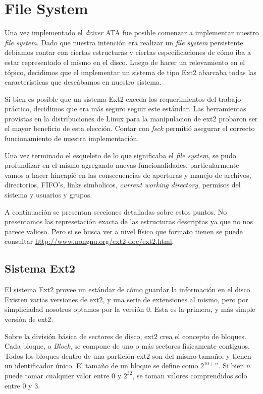 \documentclass[a4paper,10pt]{article}
\begin{document}
\newpage
\section{File System}
    
Una vez implementado el \textit{driver} ATA fue posible comenzar a implementar nuestro \textit{file system}.
Dado que nuestra intención era realizar un \textit{file system} persistente debíamos contar con ciertas estructuras
y ciertas especificaciones de cómo iba a estar representado el mismo en el disco. Luego de hacer un relevamiento
en el tópico, decidimos que el implementar un sistema de tipo Ext2 abarcaba todas las características que deseábamos
en nuestro sistema. 

Si bien es posible que un sistema Ext2 exceda los requerimientos del trabajo práctico, decidimos que era más seguro seguir este estándar. 
Las herramientas provistas en la distribuciones de Linux para la manipulacion de ext2 probaron ser el mayor beneficio de esta elección.
Contar con \textit{fsck} permitió asegurar el correcto funcionamiento de nuestra implementación.

Una vez terminado el esqueleto de lo que significaba el \textit{file system}, se pudo profundizar en el mismo agregando
nuevas funcionalidades, particularmente vamos a hacer hincapié en las consecuencias de aperturas y manejo de
archivos, directorios, FIFO's, links simbolicos, \textit{current working
directory}, permisos del sistema y usuarios y grupos.

A continuación se presentan secciones detalladas sobre estos puntos.
No presentamos las represetación exacta de las estructuras descriptas ya que no nos parece valioso.
Pero si se busca ver a nivel físico que formato tienen se puede consultar \url{http://www.nongnu.org/ext2-doc/ext2.html}.

\subsection{Sistema Ext2}
El sistema Ext2 provee un estándar de cómo guardar la información en el disco.
Existen varias versiones de ext2, y una serie de extensiones al mismo, pero por simpliciadad nosotros optamos por la versión 0.
Esta es la primera, y más simple versión de ext2.

Sobre la división básica de sectores de disco, ext2 crea el concepto de bloques.
Cada bloque, o \textit{Block}, se compone de uno o más sectores físicamente contiguos.
Todos los bloques dentro de una partición ext2 son del mismo tamaño, y tienen un identificador único.
El tamaño de un bloque se define como $ 2^{10 + n} $.
Si bien $n$ puede tomar cualquier valor entre 0 y $ 2^{32} $, se toman valores comprendidos solo entre 0 y 3.
\end{document}
